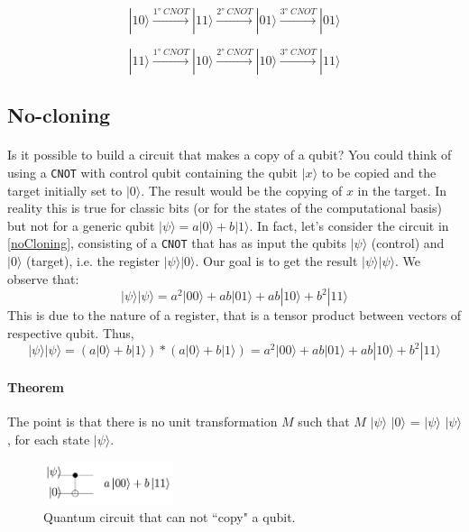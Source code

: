 \documentclass[a4paper,10pt]{article}
\begin{document}
$$|10\rangle \xrightarrow{\ang{1} \; CNOT} |11\rangle \xrightarrow{\ang{2} \; CNOT} |01\rangle \xrightarrow{\ang{3} \; CNOT} |01\rangle$$

$$|11\rangle \xrightarrow{\ang{1} \; CNOT} |10\rangle \xrightarrow{\ang{2} \; CNOT} |10\rangle \xrightarrow{\ang{3} \; CNOT} |11\rangle$$

\subsection{No-cloning}

\paragraph{} Is it possible to build a circuit that makes a copy of a qubit? You could think of using a \texttt{CNOT} with control qubit containing the qubit $|x\rangle$ to be copied and the target initially set to $|0\rangle$. The result would be the copying of $x$ in the target. In reality this is true for classic bits (or for the states of the computational basis) but not for a generic qubit $|\psi\rangle = a|0\rangle + b|1\rangle$. In fact, let's consider the circuit in \autoref{noCloning}, consisting of a \texttt{CNOT} that has as input the qubits $|\psi\rangle$ (control) and $|0\rangle$ (target), i.e. the register $|\psi\rangle |0\rangle$.
Our goal is to get the result $|\psi\rangle |\psi\rangle$. We observe that:
$$|\psi\rangle|\psi\rangle = a^2|00\rangle + ab|01\rangle + ab|10\rangle + b^2|11\rangle$$
This is due to the nature of a register, that is a tensor product between vectors of respective qubit. Thus, 
$$|\psi\rangle|\psi\rangle = (a|0\rangle + b|1\rangle) * (a|0\rangle + b|1\rangle) = a^2|00\rangle + ab|01\rangle + ab|10\rangle + b^2|11\rangle$$

\paragraph{Theorem} The point is that there is no unit transformation $M$ such that $M$ $|\psi\rangle$ $|0\rangle$ = $|\psi\rangle$ $|\psi\rangle$, for each state $|\psi\rangle$.

\begin{figure}[!htb]
\begin{center}
\includegraphics[width=1.5in]{images/noCloning.png}
\caption{Quantum circuit that can not ``copy" a qubit.}
\label{noCloning}
\end{center}
\end{figure}
\end{document}
